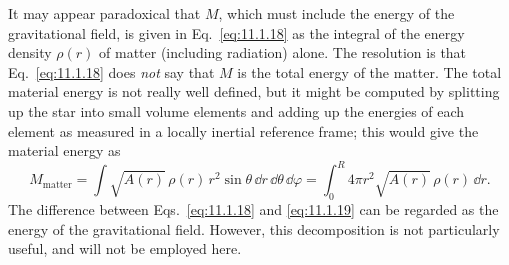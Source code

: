 It may appear paradoxical that \(M\), which must include the energy of the
gravitational field, is given in Eq.~\eqref{eq:11.1.18} as the integral of
the energy density \(\rho(r)\) of matter (including radiation) alone. The
resolution is that Eq.~\eqref{eq:11.1.18} does \emph{not} say that \(M\) is
the total energy of the matter. The total material energy is not really well
defined, but it might be computed by splitting up the star into small volume
elements and adding up the energies of each element as measured in a locally
inertial reference frame; this would give the material energy as
\begin{equation}
  M_{\mathrm{matter}}
  =
  \int\sqrt{A(r)}\,\rho(r)\,r^2\sin\theta\,\dd r\,\dd\theta\,\dd\varphi
  =
  \int_0^R4\pi r^2\sqrt{A(r)}\,\rho(r)\,\dd r.
  \tag{11.1.19}\label{eq:11.1.19}
\end{equation}
The difference between Eqs.~\eqref{eq:11.1.18} and \eqref{eq:11.1.19} can
be regarded as the energy of the gravitational field. However, this
decomposition is not particularly useful, and will not be employed here.

